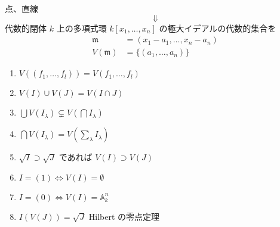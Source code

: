 \documentclass[uplatex,dvipdfmx,a4paper,11pt]{jlreq}
\renewcommand{\AA}{\mathbb{A}}
\newcommand{\mm}{\mathfrak{m}}
\numberwithin{equation}{section}
\theoremstyle{definition}
\begin{document}
\begin{itembox}[l]{点、直線}
  \begin{equation*}
    \Downarrow
  \end{equation*}
  代数的閉体 $k$ 上の多項式環 $k[x_1,\ldots,x_n]$ の極大イデアルの代数的集合を
  \begin{align}
    \mm    & = (x_1 - a_1,\ldots,x_n - a_n)   \\
    V(\mm) & = \lbrace(a_1,\ldots,a_n)\rbrace
  \end{align}
\end{itembox}
\begin{proposition}
  \begin{enumerate}
    \item $V((f_1,\ldots,f_l)) = V(f_1,\ldots,f_l)$
    \item $V(I)\cup V(J) = V(I\cap J)$
    \item $\bigcup V(I_\lambda) \subsetneq V(\bigcap I_\lambda)$
    \item $\bigcap V(I_\lambda) = V(\sum_{\lambda}I_\lambda)$
    \item $\sqrt{I}\supset\sqrt{J}$ であれば $V(I)\supset V(J)$
    \item $I = (1) \iff V(I) = \emptyset$
    \item $I = (0) \iff V(I) = \AA_k^n$
    \item $I(V(J)) = \sqrt{J}$ Hilbert の零点定理
  \end{enumerate}
\end{proposition}
\end{document}
